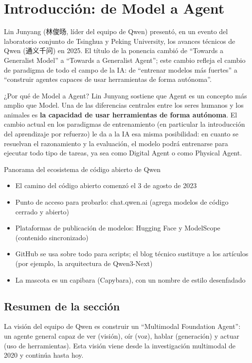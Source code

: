 \section{Introducción: de Model a Agent}

Lin Junyang (林俊旸, líder del equipo de Qwen) presentó, en un evento del laboratorio conjunto de Tsinghua y Peking University, los avances técnicos de Qwen (通义千问) en 2025. El título de la ponencia cambió de ``Towards a Generalist Model'' a ``Towards a Generalist Agent''; este cambio refleja el cambio de paradigma de todo el campo de la IA: de ``entrenar modelos más fuertes'' a ``construir agentes capaces de usar herramientas de forma autónoma''.

\begin{importantbox}{¿Por qué de Model a Agent?}
Lin Junyang sostiene que Agent es un concepto más amplio que Model. Una de las diferencias centrales entre los seres humanos y los animales es \textbf{la capacidad de usar herramientas de forma autónoma}. El cambio actual en los paradigmas de entrenamiento (en particular la introducción del aprendizaje por refuerzo) le da a la IA esa misma posibilidad: en cuanto se resuelvan el razonamiento y la evaluación, el modelo podrá entrenarse para ejecutar todo tipo de tareas, ya sea como Digital Agent o como Physical Agent.
\end{importantbox}

\begin{knowledgebox}{Panorama del ecosistema de código abierto de Qwen}
\begin{itemize}
    \item El camino del código abierto comenzó el 3 de agosto de 2023
    \item Punto de acceso para probarlo: chat.qwen.ai (agrega modelos de código cerrado y abierto)
    \item Plataformas de publicación de modelos: Hugging Face y ModelScope (contenido sincronizado)
    \item GitHub se usa sobre todo para scripts; el blog técnico sustituye a los artículos (por ejemplo, la arquitectura de Qwen3-Next)
    \item La mascota es un capibara (Capybara), con un nombre de estilo desenfadado
\end{itemize}
\end{knowledgebox}

\subsection{Resumen de la sección}

La visión del equipo de Qwen es construir un ``Multimodal Foundation Agent'': un agente general capaz de ver (visión), oír (voz), hablar (generación) y actuar (uso de herramientas). Esta visión viene desde la investigación multimodal de 2020 y continúa hasta hoy.

